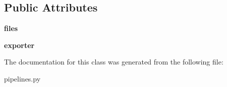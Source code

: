 \subsection*{Public Attributes}
\begin{DoxyCompactItemize}
\item 
\hypertarget{classbookcrawl_1_1pipelines_1_1BookcrawlPipeline_af5225a56cc450b9852a9d17a9c86bfa5}{}{\bfseries files}\label{classbookcrawl_1_1pipelines_1_1BookcrawlPipeline_af5225a56cc450b9852a9d17a9c86bfa5}

\item 
\hypertarget{classbookcrawl_1_1pipelines_1_1BookcrawlPipeline_ae3f4d61e44edef2621ee66a91bde18db}{}{\bfseries exporter}\label{classbookcrawl_1_1pipelines_1_1BookcrawlPipeline_ae3f4d61e44edef2621ee66a91bde18db}

\end{DoxyCompactItemize}


The documentation for this class was generated from the following file\+:\begin{DoxyCompactItemize}
\item 
pipelines.\+py\end{DoxyCompactItemize}
